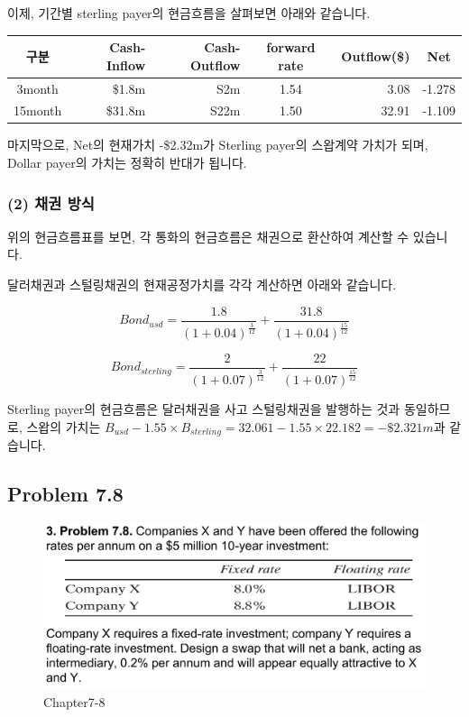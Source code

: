 \documentclass[
  letterpaper,
  DIV=11,
  numbers=noendperiod]{scrreprt}
\begin{document}
이제, 기간별 sterling payer의 현금흐름을 살펴보면 아래와 같습니다.

\begin{longtable}[]{@{}crrcrc@{}}
\toprule\noalign{}
구분 & Cash-Inflow & Cash-Outflow & forward rate & Outflow(\$) & Net \\
\midrule\noalign{}
\endhead
\bottomrule\noalign{}
\endlastfoot
3month & \$1.8m & S2m & 1.54 & 3.08 & -1.278 \\
15month & \$31.8m & S22m & 1.50 & 32.91 & -1.109 \\
\end{longtable}

마지막으로, Net의 현재가치 -\$2.32m가 Sterling payer의 스왑계약 가치가
되며, Dollar payer의 가치는 정확히 반대가 됩니다.

\subsubsection*{(2) 채권 방식}\label{uxcc44uxad8c-uxbc29uxc2dd}

위의 현금흐름표를 보면, 각 통화의 현금흐름은 채권으로 환산하여 계산할 수
있습니다.

달러채권과 스털링채권의 현재공정가치를 각각 계산하면 아래와 같습니다.

\[Bond_{usd}=\frac{1.8}{(1+0.04)^{\frac{3}{12}}}+\frac{31.8}{(1+0.04)^{\frac{15}{12}}}\]

\[Bond_{sterling}=\frac{2}{(1+0.07)^{\frac{3}{12}}}+\frac{22}{(1+0.07)^{\frac{15}{12}}}\]

Sterling payer의 현금흐름은 달러채권을 사고 스털링채권을 발행하는 것과
동일하므로, 스왑의 가치는
\(B_{usd}-1.55\times B_{sterling}=32.061-1.55\times 22.182=-\$2.321m\)과
같습니다.

\subsection*{\texorpdfstring{\textbf{Problem
7.8}}{Problem 7.8}}\label{problem-7.8}

\begin{figure}[H]

{\centering \includegraphics{images/선물옵션_7-8.png}

}

\caption{Chapter7-8}

\end{figure}%
\end{document}
